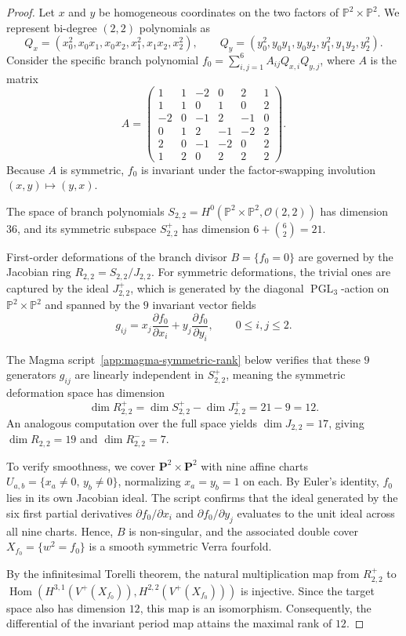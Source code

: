 \documentclass{amsart}
\theoremstyle{definition}
\theoremstyle{remark}
\newcommand{\PP}{\mathbb P}
\newcommand{\OO}{\mathcal O}
\DeclareMathOperator{\PGL}{PGL}
\begin{document}
\begin{proof}
Let \(x\) and \(y\) be homogeneous coordinates on the two factors of \(\PP^2\times\PP^2\). We represent bi-degree \((2,2)\) polynomials as
\[
  Q_x=(x_0^2,x_0x_1,x_0x_2,x_1^2,x_1x_2,x_2^2),
  \qquad
  Q_y=(y_0^2,y_0y_1,y_0y_2,y_1^2,y_1y_2,y_2^2).
\]
Consider the specific branch polynomial \(f_0=\sum_{i,j=1}^6 A_{ij}Q_{x,i}Q_{y,j}\), where \(A\) is the matrix
\[
A=
\begin{pmatrix}
  1&  1& -2&  0&  2&  1\\
  1&  1&  0&  1&  0&  2\\
 -2&  0& -1&  2& -1&  0\\
  0&  1&  2& -1& -2&  2\\
  2&  0& -1& -2&  0&  2\\
  1&  2&  0&  2&  2&  2
\end{pmatrix}.
\]
Because \(A\) is symmetric, \(f_0\) is invariant under the factor-swapping involution \((x,y)\mapsto(y,x)\). 

The space of branch polynomials \(S_{2,2}=H^0(\PP^2\times\PP^2,\OO(2,2))\) has dimension \(36\), and its symmetric subspace \(S^+_{2,2}\) has dimension \(6+\binom{6}{2}=21\). 

First-order deformations of the branch divisor \(B=\{f_0=0\}\) are governed by the Jacobian ring \(R_{2,2}=S_{2,2}/J_{2,2}\). For symmetric deformations, the trivial ones are captured by the ideal \(J^+_{2,2}\), which is generated by the diagonal \(\PGL_3\)-action on \(\PP^2\times\PP^2\) and spanned by the \(9\) invariant vector fields
\[
  g_{ij}
  = x_j\frac{\partial f_0}{\partial x_i}
  + y_j\frac{\partial f_0}{\partial y_i},
  \qquad
  0\leq i,j\leq 2.
\]

The Magma script~\cref{app:magma-symmetric-rank} below verifies that these \(9\) generators \(g_{ij}\) are linearly independent in \(S^+_{2,2}\), meaning the symmetric deformation space has dimension
  \[
    \dim R^+_{2,2}
    =
    \dim S^+_{2,2}-\dim J^+_{2,2}
    =
    21-9
    =
    12.
  \]
An analogous computation over the full space yields \(\dim J_{2,2}=17\), giving \(\dim R_{2,2}=19\) and \(\dim R^-_{2,2}=7\).


To verify smoothness, we cover \(\mathbf{P}^2\times\mathbf{P}^2\) with nine affine charts \(U_{a,b}=\{x_a\neq0,\, y_b\neq0\}\), normalizing \(x_a=y_b=1\) on each. By Euler's identity, \(f_0\) lies in its own Jacobian ideal. The script confirms that the ideal generated by the six first partial derivatives \(\partial f_0/\partial x_i\) and \(\partial f_0/\partial y_j\) evaluates to the unit ideal across all nine charts. Hence, \(B\) is non-singular, and the associated double cover \(X_{f_0}=\{w^2=f_0\}\) is a smooth symmetric Verra fourfold.

By the infinitesimal Torelli theorem, the natural multiplication map from \(R^+_{2,2}\) to \(\operatorname{Hom}(H^{3,1}(V^+(X_{f_0})),H^{2,2}(V^+(X_{f_0})))\) is injective. Since the target space also has dimension \(12\), this map is an isomorphism. Consequently, the differential of the invariant period map attains the maximal rank of \(12\).
\end{proof}
\end{document}
